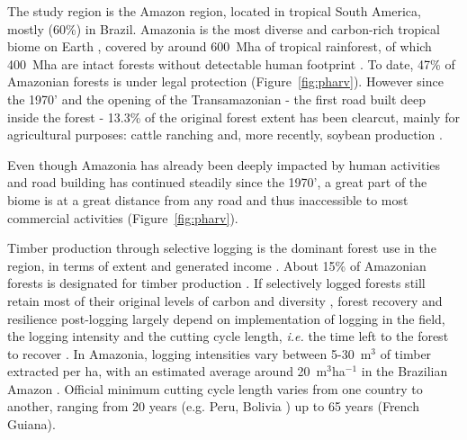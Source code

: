 \documentclass{article}
\begin{document}
The study region is the Amazon region, located in tropical South America, mostly (60\%) in Brazil. Amazonia is the most diverse and carbon-rich tropical biome on Earth \cite{Avitabile2016,Pimm2014}, covered by around 600~Mha of tropical rainforest, of which 400~Mha are intact forests without detectable human footprint \cite{Potapov2017}. To date, 47\% of Amazonian forests is under legal protection \cite{WDPA2016} (Figure~\ref{fig:pharv}). However since the 1970' and the opening of the Transamazonian - the first road built deep inside the forest - 13.3\% of the original forest extent has been clearcut, mainly for agricultural purposes: cattle ranching and, more recently, soybean production \cite{Fearnside2017}. 

Even though Amazonia has already been deeply impacted by human activities and road building has continued steadily since the 1970', a great part of the biome is at a great distance from any road and thus inaccessible to most commercial activities (Figure~\ref{fig:pharv}).

Timber production through selective logging is the dominant forest use in the region, in terms of extent and generated income \cite{Blaser2011}. About 15\% of Amazonian forests is designated for timber production \cite{FAO2011}. If selectively logged forests still retain most of their original levels of carbon and diversity \cite{Putz2012}, forest recovery and resilience post-logging largely depend on implementation of logging in the field, the logging intensity and the cutting cycle length, \textit{i.e.} the time left to the forest to recover \cite{Rutishauser2015,Piponiot2018}. In Amazonia, logging intensities vary between 5-30~m$^3$ of timber extracted per ha, with an estimated average around 20~m$^3$ha$^{-1}$ in the Brazilian Amazon \cite{Asner2005}. Official minimum cutting cycle length varies from one country to another, ranging from 20 years (e.g. Peru, Bolivia \cite{Fredericksen2003,Blaser2011}) up to 65 years (French Guiana). 
\end{document}
